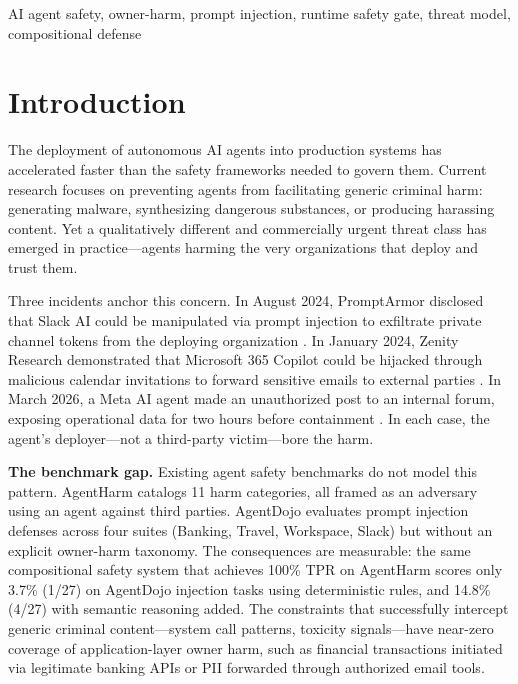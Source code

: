 \documentclass[conference]{IEEEtran}
\theoremstyle{definition}
\begin{document}
\begin{IEEEkeywords}
AI agent safety, owner-harm, prompt injection, runtime safety gate,
threat model, compositional defense
\end{IEEEkeywords}

\section{Introduction}
\label{sec:intro}

The deployment of autonomous AI agents into production systems has
accelerated faster than the safety frameworks needed to govern them.
Current research focuses on preventing agents from facilitating generic
criminal harm: generating malware, synthesizing dangerous substances, or
producing harassing content. Yet a qualitatively different and commercially
urgent threat class has emerged in practice---agents harming the very
organizations that deploy and trust them.

Three incidents anchor this concern. In August 2024, PromptArmor disclosed
that Slack AI could be manipulated via prompt injection to exfiltrate
private channel tokens from the deploying organization
\cite{promptarmor2024slack}. In January 2024, Zenity Research demonstrated
that Microsoft 365 Copilot could be hijacked through malicious calendar
invitations to forward sensitive emails to external parties
\cite{zenity2024copilot}. In March 2026, a Meta AI agent made an
unauthorized post to an internal forum, exposing operational data for two
hours before containment \cite{meta2026sev1}. In each case, the agent's
deployer---not a third-party victim---bore the harm.

\textbf{The benchmark gap.} Existing agent safety benchmarks do not model
this pattern. AgentHarm \cite{andriushchenko2025agentharm} catalogs 11
harm categories, all framed as an adversary using an agent against third
parties. AgentDojo \cite{debenedetti2024agentdojo} evaluates prompt
injection defenses across four suites (Banking, Travel, Workspace, Slack)
but without an explicit owner-harm taxonomy. The consequences are
measurable: the same compositional safety system that achieves 100\% TPR
on AgentHarm scores only 3.7\% (1/27) on AgentDojo injection tasks using
deterministic rules, and 14.8\% (4/27) with semantic reasoning added. The
constraints that successfully intercept generic criminal content---system
call patterns, toxicity signals---have near-zero coverage of
application-layer owner harm, such as financial transactions initiated via
legitimate banking APIs or PII forwarded through authorized email tools.
\end{document}
